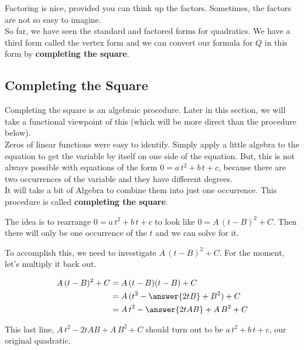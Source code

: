 \documentclass{ximera}
\begin{document}
Factoring is nice, provided you can think up the factors.  Sometimes, the factors are not so easy to imagine. \\


So far, we have seen the standard and factored forms for quadratics. We have a third form called the vertex form and we can convert our formula for $Q$ in this form by \textbf{completing the square}.





\subsection*{Completing the Square}

Completing the square is an algebraic procedure.  Later in this section, we will take a functional viewpoint of this (which will be more direct than the procedure below). \\



Zeros of linear functions were easy to identify.  Simply apply a little algebra to the equation to get the variable by itself on one side of the equation.  But, this is not always possible with equations of the form $0 = a \, t^2 + b \, t + c $, because there are two occurrences of the variable and they have different degrees. \\


It will take a bit of Algebra to combine them into just one occurrence. This procedure is called \textbf{completing the square}. \\



\begin{idea}


The idea is to rearrange  $0 = a \, t^2 + b \, t + c$ to look like $0 = A \, (t-B)^2 + C$.  Then there will only be  one occurrence of the $t$ and we can solve for it.


To accomplish this, we need to investigate $A \, (t-B)^2 + C$. For the moment, let's multiply it back out.


\begin{align*}
A \, (t-B)^2 + C & = A \, (t-B)(t-B) + C \\
& = A \, (t^2 - \answer{2 t B} + B^2) + C  \\
& = A \, t^2 - \answer{2 t A B} + A \, B^2 + C
\end{align*}

This last line, $A \, t^2 - 2 t A B + A \, B^2 + C$ should turn out to be $a \, t^2 + b \, t + c$, our original quadratic.

\end{idea}
\end{document}
